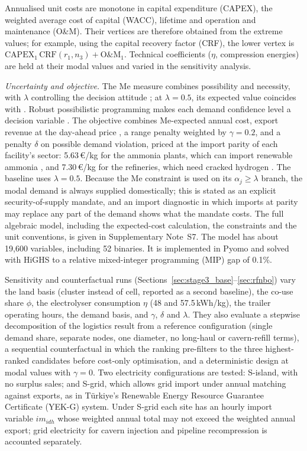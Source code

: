 \documentclass[preprint,12pt,authoryear]{elsarticle}
\begin{document}
Annualised unit costs are monotone in capital expenditure (CAPEX), the weighted average cost of capital (WACC), lifetime and operation and maintenance (O\&M). Their vertices are therefore obtained from the extreme values; for example, using the capital recovery factor (CRF), the lower vertex is $\text{CAPEX}_1\,\text{CRF}(r_1, n_3) + \text{O\&M}_1$. Technical coefficients ($\eta$, compression energies) are held at their modal values and varied in the sensitivity analysis.

{\itshape Uncertainty and objective.} The Me measure combines possibility and necessity, with $\lambda$ controlling the decision attitude \citep{xu2013approximation}; at $\lambda=0.5$, its expected value coincides with \citet{jimenez2007linear}. Robust possibilistic programming makes each demand confidence level a decision variable \citep{pishvaee2012robust}. The objective combines Me-expected annual cost, export revenue at the day-ahead price \citep{epias2024}, a range penalty weighted by $\gamma=0.2$, and a penalty $\delta$ on possible demand violation, priced at the import parity of each facility's sector: 5.63\,€/kg for the ammonia plants, which can import renewable ammonia \citep{h2global2024}, and 7.30\,€/kg for the refineries, which need cracked hydrogen \citep{spglobal2025cracking}. The baseline uses $\lambda=0.5$. Because the Me constraint is used on its $\alpha_j\ge\lambda$ branch, the modal demand is always supplied domestically; this is stated as an explicit security-of-supply mandate, and an import diagnostic in which imports at parity may replace any part of the demand shows what the mandate costs. The full algebraic model, including the expected-cost calculation, the constraints and the unit conventions, is given in Supplementary Note~S7.
The model has about 19,600 variables, including 52 binaries. It is implemented in Pyomo \citep{bynum2021pyomo} and solved with HiGHS \citep{huangfu2018parallelizing} to a relative mixed-integer programming (MIP) gap of 0.1\%.

Sensitivity and counterfactual runs (Sections~\ref{sec:stage3_base}--\ref{sec:rfnbo}) vary the land basis (cluster instead of cell, reported as a second baseline), the co-use share $\phi$, the electrolyser consumption $\eta$ (48 and 57.5\,kWh/kg), the trailer operating hours, the demand basis, and $\gamma$, $\delta$ and $\lambda$. They also evaluate a stepwise decomposition of the logistics result from a reference configuration (single demand share, separate nodes, one diameter, no long-haul or cavern-refill terms), a sequential counterfactual in which the ranking pre-filters to the three highest-ranked candidates before cost-only optimisation, and a deterministic design at modal values with $\gamma=0$. Two electricity configurations are tested: S-island, with no surplus sales; and S-grid, which allows grid import under annual matching against exports, as in Türkiye's Renewable Energy Resource Guarantee Certificate (YEK-G) system. Under S-grid each site has an hourly import variable $im_{idh}$ whose weighted annual total may not exceed the weighted annual export; grid electricity for cavern injection and pipeline recompression is accounted separately.
\end{document}
